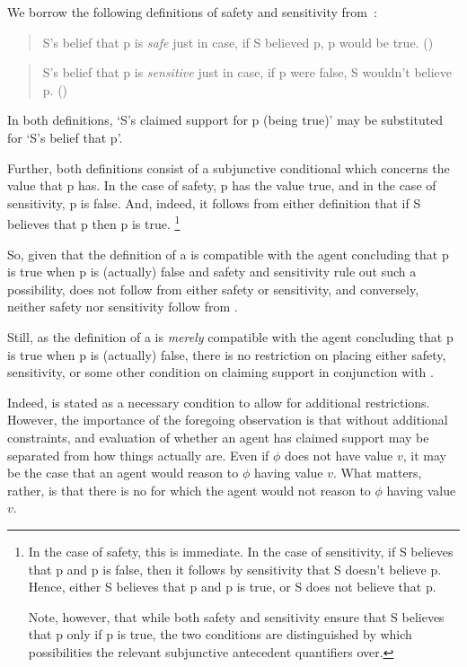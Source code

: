\begin{note}
  We borrow the following definitions of safety and sensitivity from~\citeauthor{Zalabardo:2017td}:

  \begin{quote}
    S's belief that p is \emph{safe} just in case, if S believed p, p would be true.\newline
    \mbox{}\hfill\mbox{(\citeyear[1]{Zalabardo:2017td})}
  \end{quote}

  \begin{quote}
    S's belief that p is \emph{sensitive} just in case, if p were false, S wouldn't believe p.\nolinebreak
    \mbox{}\hfill\mbox{(\citeyear[2]{Zalabardo:2017td})}
  \end{quote}

  In both definitions, `S's claimed support for p (being true)' may be substituted for `S's belief that p'.

  Further, both definitions consist of a subjunctive conditional which concerns the value that p has.
  In the case of safety, p has the value true, and in the case of sensitivity, p is false.
  And, indeed, it follows from either definition that if S believes that p then p is true.\nolinebreak
  \footnote{
    In the case of safety, this is immediate.
    In the case of sensitivity, if S believes that p and p is false, then it follows by sensitivity that S doesn't believe p.
    Hence, either S believes that p and p is true, or S does not believe that p.

    Note, however, that while both safety and sensitivity ensure that S believes that p only if p is true, the two conditions are distinguished by which possibilities the relevant subjunctive antecedent quantifiers over.
  }

  So, given that the definition of a \sink{} is compatible with the agent concluding that p is true when p is (actually) false and safety and sensitivity rule out such a possibility, \ideaCSA{} does not follow from either safety or sensitivity, and conversely, neither safety nor sensitivity follow from \ideaCSA{}.

  Still, as the definition of a \sink{} is \emph{merely} compatible with the agent concluding that p is true when p is (actually) false, there is no restriction on placing either safety, sensitivity, or some other condition on claiming support in conjunction with \ideaCSA{}.

  Indeed, \ideaCSA{} is stated as a necessary condition to allow for additional restrictions.
  However, the importance of the foregoing observation is that without additional constraints, and evaluation of whether an agent has claimed support may be separated from how things actually are.
  Even if \(\phi\) does not have value \(v\), it may be the case that an agent would reason to \(\phi\) having value \(v\).
  What matters, rather, is that there is no \epAdv{} \world{} for which the agent would not reason to \(\phi\) having value \(v\).
\end{note}

